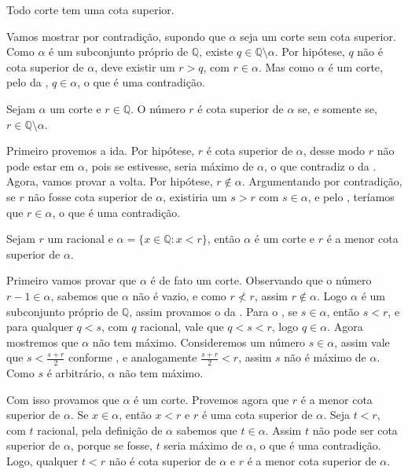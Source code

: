 \documentclass[../main.tex]{subfiles}
\begin{document}
\begin{teo}\label{reais-teo-todoCorteTemCotaSuperior}
    Todo corte tem uma cota superior.
\end{teo}
\begin{dem}
    Vamos mostrar por contradição, supondo que $\alpha$ seja um corte sem cota superior.
    Como $\alpha$ é um subconjunto próprio de $\mathbb{Q}$, existe $q \in \mathbb{Q} \setminus \alpha$. Por hipótese, $q$ não é cota superior de $\alpha$, deve existir um $r > q$, com $r \in \alpha$. Mas como $\alpha$ é um corte, pelo  da , $q \in \alpha$, o que é uma contradição.
\end{dem}

\begin{prop}
    Sejam $\alpha$ um corte e $r \in \mathbb{Q}$. O número $r$ é cota superior de $\alpha$ se, e somente se, $r \in \mathbb{Q} \setminus \alpha$. 
\end{prop}
\begin{dem}
    Primeiro provemos a ida. Por hipótese, $r$ é cota superior de $\alpha$, desse modo $r$ não pode estar em $\alpha$, pois se estivesse, seria máximo de $\alpha$, o que contradiz o  da .
    Agora, vamos provar a volta. Por hipótese, $r \not\in \alpha$. Argumentando por contradição, se $r$ não fosse cota superior de $\alpha$, existiria um $s > r$ com $s \in \alpha$, e pelo , teríamos que $r \in \alpha$, o que é uma contradição.
\end{dem}
\begin{teo}\label{reais-teo-corteRacional}
    Sejam $r$ um racional e $\alpha = \{ x \in \mathbb{Q} : x < r \}$, então $\alpha$ é um corte e $r$ é a menor cota superior de $\alpha$.
\end{teo}
\begin{dem}
    Primeiro vamos provar que $\alpha$ é de fato um corte. Observando que o número $r - 1 \in \alpha$, sabemos que $\alpha$ não é vazio, e como $r \not< r$, assim $r \not\in \alpha$. Logo $\alpha$ é um subconjunto próprio de $\mathbb{Q}$, assim provamos o  da .
    Para o , se $s \in \alpha$, então $s < r$, e para qualquer $q < s$, com $q$ racional, vale que $q < s < r$, logo $q \in \alpha$.
    Agora mostremos que $\alpha$ não tem máximo. Consideremos um número $s \in \alpha$, assim vale que $s < \frac{s+r}{2}$ conforme , e analogamente $\frac{s+r}{2} < r$, assim $s$ não é máximo de $\alpha$. Como $s$ é arbitrário, $\alpha$ não tem máximo.

    Com isso provamos que $\alpha$ é um corte. Provemos agora que $r$ é a menor cota superior de $\alpha$. Se $x \in \alpha$, então $x < r$ e $r$ é uma cota superior de $\alpha$. Seja $t < r$, com $t$ racional, pela definição de $\alpha$ sabemos que $t \in \alpha$. Assim $t$ não pode ser cota superior de $\alpha$, porque se fosse, $t$ seria máximo de $\alpha$, o que é uma contradição. Logo, qualquer $t < r$ não é cota superior de $\alpha$ e $r$ é a menor cota superior de $\alpha$.
\end{dem}
\end{document}
